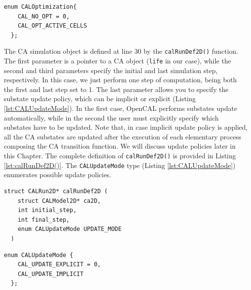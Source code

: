 \begin{lstlisting}[float,floatplacement=H, label=lst:CALOptimization, caption=The CALOptimization enum type., numbers=none]
  enum CALOptimization{
    CAL_NO_OPT = 0,
    CAL_OPT_ACTIVE_CELLS
  };
\end{lstlisting}

The CA simulation object is defined at line 30 by the
\verb'calRunDef2D()' function. The first parameter is a pointer to a
CA object (\verb'life' in our case), while the second and third
parameters specify the initial and last simulation step,
respectively. In this case, we just perform one step of computation,
being both the first and last step set to 1. The last parameter allows
you to specify the substate update policy, which can be implicit or
explicit (Listing \ref{lst:CALUpdateMode}). In the first case, OpenCAL
performs substates update automatically, while in the second the user
must explicitly specify which substates have to be updated. Note that,
in case implicit update policy is applied, all the CA substates are
updated after the execution of each elementary process composing the
CA transition function. We will discuss update policies later in this
Chapter. The complete definition of \verb'calRunDef2D()' is provided
in Listing \ref{lst:calRunDef2D()}. The \verb'CALUpdateMode' type
(Listing \ref{lst:CALUpdateMode}) enumerates possible update policies.

\begin{lstlisting}[float,floatplacement=H, label=lst:calRunDef2D(), caption=Definition of the calRunDef2D() function., numbers=none]
  struct CALRun2D* calRunDef2D (
    struct CALModel2D* ca2D,
    int initial_step,
    int final_step,
    enum CALUpdateMode UPDATE_MODE
  )
\end{lstlisting}

\begin{lstlisting}[float,floatplacement=H, label=lst:CALUpdateMode, caption=The CALUpdateMode enum type., numbers=none]
  enum CALUpdateMode {
    CAL_UPDATE_EXPLICIT = 0,
    CAL_UPDATE_IMPLICIT
  };
\end{lstlisting}

